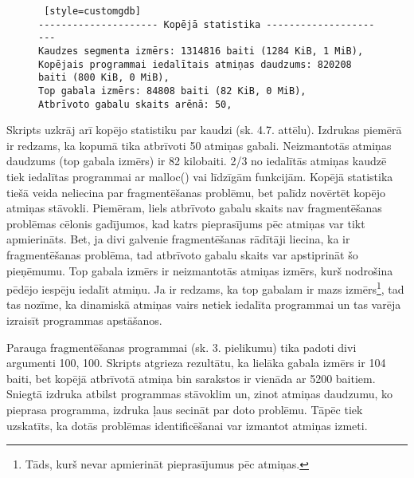 \begin{figure}[h]
\begin{lstlisting} [style=customgdb]
--------------------- Kopējā statistika ----------------------
Kaudzes segmenta izmērs: 1314816 baiti (1284 KiB, 1 MiB),
Kopējais programmai iedalītais atmiņas daudzums: 820208 baiti (800 KiB, 0 MiB),
Top gabala izmērs: 84808 baiti (82 KiB, 0 MiB),
Atbrīvoto gabalu skaits arēnā: 50,
\end{lstlisting}
\caption{\textbf{\fontsize{11}{12}\selectfont {Kopējā statistika}}}
\end{figure}

Skripts uzkrāj arī kopējo statistiku par kaudzi (sk. 4.7. attēlu). Izdrukas piemērā  ir redzams, ka kopumā tika atbrīvoti 50 atmiņas gabali.
Neizmantotās atmiņas daudzums (top gabala izmērs) ir 82 kilobaiti.
2/3 no iedalītās atmiņas kaudzē tiek iedalītas programmai ar malloc() vai līdzīgām funkcijām.
Kopējā statistika tiešā veida neliecina par fragmentēšanas problēmu, bet palīdz novērtēt kopējo atmiņas stāvokli.
Piemēram, liels atbrīvoto gabalu skaits nav fragmentēšanas problēmas cēlonis gadījumos, kad katrs pieprasījums pēc atmiņas var tikt apmierināts.
Bet, ja divi galvenie fragmentēšanas rādītāji liecina, ka ir fragmentēšanas problēma, tad atbrīvoto gabalu skaits var apstiprināt šo pieņēmumu.
Top gabala izmērs ir neizmantotās atmiņas izmērs, kurš nodrošina pēdējo iespēju iedalīt atmiņu.
Ja ir redzams, ka top gabalam ir mazs izmērs\footnote{Tāds, kurš nevar apmierināt pieprasījumus pēc atmiņas.}, tad tas nozīme, ka dinamiskā atmiņas vairs netiek iedalīta programmai un tas varēja izraisīt programmas apstāšanos.

Parauga fragmentēšanas programmai (sk. 3. pielikumu) tika padoti divi argumenti 100, 100. 
Skripts atgrieza rezultātu, ka lielāka gabala izmērs ir 104 baiti, bet kopējā atbrīvotā atmiņa bin sarakstos ir vienāda ar 5200 baitiem.
Sniegtā izdruka atbilst programmas stāvoklim un, zinot atmiņas daudzumu, ko pieprasa programma, izdruka ļaus secināt par doto problēmu.
Tāpēc tiek uzskatīts, ka dotās problēmas identificēšanai var izmantot atmiņas izmeti.





